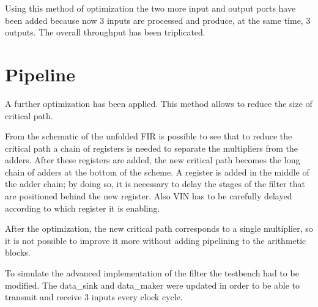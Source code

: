 Using this method of optimization the two more input and output ports have been added because
now 3 inputs are processed and produce, at the same time, 3 outputs. The overall throughput has
been triplicated.


\section{Pipeline}

A further optimization has been applied. This method allows to reduce the size of critical path.

From the schematic of the unfolded FIR is possible to see that to reduce the critical path a chain of registers
is needed to separate the multipliers from the adders. After these registers are added, the new critical path 
becomes the long chain of adders at the bottom of the scheme.
A register is added in the middle of the adder chain; by doing so, it is necessary to delay the stages of the filter
that are positioned behind the new register. Also VIN has to be carefully delayed according to which register it is enabling.

After the optimization, the new critical path corresponds to a single multiplier, so it is not possible to improve it more
without adding pipelining to the arithmetic blocks.

To simulate the advanced implementation of the filter the testbench had to be modified. The data\_sink and data\_maker were
updated in order to be able to transmit and receive 3 inputs every clock cycle.